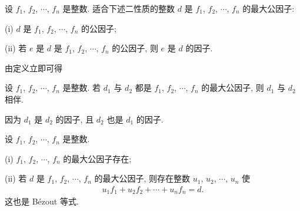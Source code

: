 \begin{definition}
    设 $f_1$, $f_2$, $\cdots$, $f_n$ 是整数. 适合下述二性质的整数 $d$ 是 $f_1$, $f_2$, $\cdots$, $f_n$ 的最大公因子:

    (i) $d$ 是 $f_1$, $f_2$, $\cdots$, $f_n$ 的公因子;

    (ii) 若 $e$ 是 $d$ 是 $f_1$, $f_2$, $\cdots$, $f_n$ 的公因子, 则 $e$ 是 $d$ 的因子.
\end{definition}

由定义立即可得
\begin{proposition}
    设 $f_1$, $f_2$, $\cdots$, $f_n$ 是整数. 若 $d_1$ 与 $d_2$ 都是 $f_1$, $f_2$, $\cdots$, $f_n$ 的最大公因子, 则 $d_1$ 与 $d_2$ 相伴.
\end{proposition}

\begin{pf}
    因为 $d_1$ 是 $d_2$ 的因子, 且 $d_2$ 也是 $d_1$ 的因子.
\end{pf}

\begin{proposition}
    设 $f_1$, $f_2$, $\cdots$, $f_n$ 是整数.

    (i) $f_1$, $f_2$, $\cdots$, $f_n$ 的最大公因子存在;

    (ii) 若 $d$ 是 $f_1$, $f_2$, $\cdots$, $f_n$ 的最大公因子, 则存在整数 $u_1$, $u_2$, $\cdots$, $u_n$ 使
    \begin{align*}
        u_1 f_1 + u_2 f_2 + \cdots + u_n f_n = d.
    \end{align*}
    这也是 Bézout 等式.
\end{proposition}

